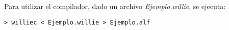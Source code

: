 

  Para utilizar el compilador, dado un archivo \textit{Ejemplo.willie}, se
ejecuta:

\begin{Verbatim}
> williec < Ejemplo.willie > Ejemplo.alf
\end{Verbatim}

